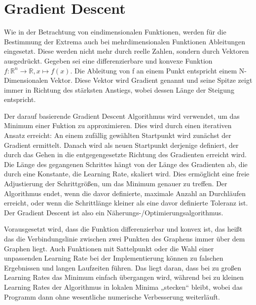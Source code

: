 \section{Gradient Descent}




Wie in der Betrachtung von eindimensionalen Funktionen, werden für die Bestimmung der Extrema auch bei mehrdimensionalen Funktionen Ableitungen eingesetzt. Diese werden nicht mehr durch reelle Zahlen, sondern durch Vektoren ausgedrückt. Gegeben sei eine differenzierbare und konvexe Funktion $ f:\mathbb{R}^n \rightarrow \mathbb{R}, x \mapsto f(x). $ Die Ableitung von f an einem Punkt entspricht einem N-Dimensionalen Vektor. Diese Vektor wird Gradient genannt und seine Spitze zeigt immer in Richtung des stärksten Anstiegs, wobei dessen Länge der Steigung entspricht.

Der darauf basierende Gradient Descent Algorithmus wird verwendet, um das Minimum einer Fuktion zu approximieren. Dies wird durch einen iterativen Ansatz erreicht: An einem zufällig gewählten Startpunkt wird zunächst der Gradient ermittelt. Danach wird als neuen Startpunkt derjenige definiert, der durch das Gehen in die entgegengesetzte Richtung des Gradienten erreicht wird. Die Länge des gegangenen Schrittes hängt von der Länge des Gradienten ab, die durch eine Konstante, die Learning Rate, skaliert wird. Dies ermöglicht eine freie Adjustierung der Schrittgrößen, um das Minimum genauer zu treffen. Der Algorithmus endet, wenn die davor definierte, maximale Anzahl an Durchläufen erreicht, oder wenn die Schrittlänge kleiner als eine davor definierte Toleranz ist. Der Gradient Descent ist also ein Näherungs-/Optimierungsalgorithmus.



Vorausgesetzt wird, dass die Funktion differenzierbar und konvex ist, das heißt das die Verbindungslinie zwischen zwei Punkten des Graphens immer über dem Graphen liegt. Auch Funktionen mit Sattelpunkt oder die Wahl einer unpassenden Learning Rate bei der Implementierung können zu falschen Ergebnissen und langen Laufzeiten führen. Das liegt daran, dass bei zu großen Learning Rates das Minimum einfach übergangen wird, während bei zu kleinen Learning Rates der Algorithmus in lokalen Minima „stecken“ bleibt, wobei das Programm dann ohne wesentliche numerische Verbesserung weiterläuft.
